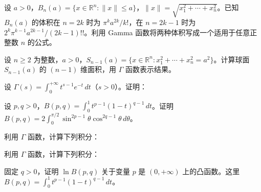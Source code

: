 \noindent\begin{minipage}{\textwidth}
设 $a>0$，$B_n(a)=\{x\in\mathbb R^n:\|x\|\le a\}$，$\|x\|=\sqrt{x_1^2+\cdots+x_n^2}$。已知 $B_n(a)$ 的体积在 $n=2k$ 时为 $\pi^ka^{2k}/k!$，在 $n=2k-1$ 时为 $2^k\pi^{k-1}a^{2k-1}/(2k-1)!!$。利用 Gamma 函数将两种体积写成一个适用于任意正整数 $n$ 的公式。
\end{minipage}\par\vfill
\newpage
\noindent\begin{minipage}{\textwidth}
设 $n\ge2$ 为整数，$a>0$，$\displaystyle S_{n-1}(a)=\{x\in\mathbb R^n:x_1^2+\cdots+x_n^2=a^2\}$。计算球面 $S_{n-1}(a)$ 的 $(n-1)$ 维面积，用 $\Gamma$ 函数表示结果。
\end{minipage}\par\vfill
\noindent\begin{minipage}{\textwidth}
设 $\Gamma(s)=\int_0^{+\infty}t^{s-1}e^{-t}\,dt$（$s>0$）。证明：
\end{minipage}\par\vfill
\noindent\begin{minipage}{\textwidth}
设 $p,q>0$，$B(p,q)=\int_0^1t^{p-1}(1-t)^{q-1}\,dt$。证明 $\displaystyle B(p,q)=2\int_0^{\pi/2}\sin^{2p-1}\theta\cos^{2q-1}\theta\,d\theta$。
\end{minipage}\par\vfill
\newpage
\noindent\begin{minipage}{\textwidth}
利用 $\Gamma$ 函数，计算下列积分：
\end{minipage}\par\vfill
\noindent\begin{minipage}{\textwidth}
利用 $\Gamma$ 函数，计算下列积分：
\end{minipage}\par\vfill
\noindent\begin{minipage}{\textwidth}
固定 $q>0$，证明 $\ln B(p,q)$ 关于变量 $p$ 是 $(0,+\infty)$ 上的凸函数。这里 $B(p,q)=\int_0^1t^{p-1}(1-t)^{q-1}\,dt$。
\end{minipage}\par\vfill
